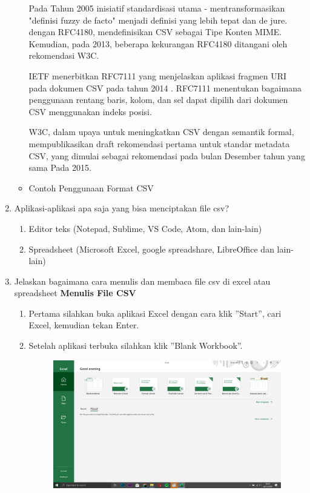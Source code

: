 \begin{enumerate}
\begin{itemize}
        \hspace*{1cm}Pada Tahun 2005 inisiatif standardisasi utama - mentransformasikan "definisi fuzzy de facto" menjadi definisi yang lebih tepat dan de jure. dengan RFC4180, mendefinisikan CSV sebagai Tipe Konten MIME. Kemudian, pada 2013, beberapa kekurangan RFC4180 ditangani oleh rekomendasi W3C.
        
        \hspace*{1cm}IETF menerbitkan RFC7111 yang menjelaskan aplikasi fragmen URI pada dokumen CSV  pada tahun 2014 . RFC7111 menentukan bagaimana penggunaan rentang baris, kolom, dan sel dapat dipilih dari dokumen CSV menggunakan indeks posisi.
       
        \hspace*{1cm}W3C, dalam upaya untuk meningkatkan CSV dengan semantik formal, mempublikasikan draft rekomendasi pertama untuk standar metadata CSV, yang dimulai sebagai rekomendasi pada bulan Desember tahun yang sama Pada 2015.
       
	\item Contoh Penggunaan Format CSV
	
	\end{itemize}
	
    \item Aplikasi-aplikasi apa saja yang bisa menciptakan file csv?
	\begin{enumerate}
		\item Editor teks (Notepad, Sublime, VS Code, Atom, dan lain-lain)
		\item Spreadsheet (Microsoft Excel, google spreadshare, LibreOffice dan lain-lain)
	\end{enumerate}
		
	\item Jelaskan bagaimana cara menulis dan membaca file csv di excel atau spreadsheet	
	\textbf{Menulis File CSV}
	\begin{enumerate}
		\item Pertama silahkan buka aplikasi Excel dengan cara klik ''Start'', cari Excel, kemudian tekan Enter.
		
	
		\item Setelah aplikasi terbuka silahkan klik ''Blank Workbook''.
		
		\begin{figure}[!htbp]
			\includegraphics[width=10cm]{figures/a1.PNG}
			\centering
		\end{figure}
		\newpage
		

\end{enumerate}
\end{enumerate}
